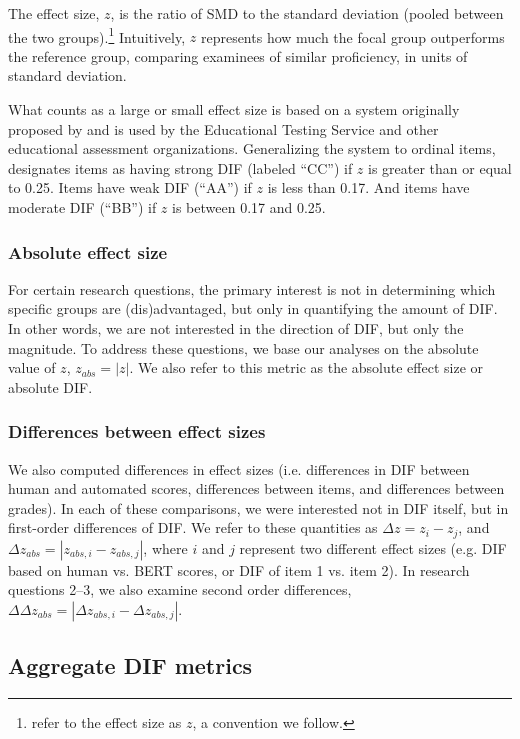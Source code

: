 \documentclass [PhD] {uclathes}
\begin{document}
The effect size, $z$, is the ratio of SMD to the standard deviation (pooled between the two groups).\footnote{\cite{ormerod2022automated} refer to the effect size as $z$, a convention we follow.} Intuitively, $z$ represents how much the focal group outperforms the reference group, comparing examinees of similar proficiency, in units of standard deviation.

What counts as a large or small effect size is based on a system originally proposed by \citet{zwick1993assessment} and is used by the Educational Testing Service and other educational assessment organizations. Generalizing the system to ordinal items, \citet[][p. 150]{naep2001} designates items as having strong DIF (labeled “CC”) if $z$ is greater than or equal to 0.25. Items have weak DIF (“AA”) if $z$ is less than 0.17. And items have moderate DIF (“BB”) if $z$ is between 0.17 and 0.25.

\subsubsection{Absolute effect size}

For certain research questions, the primary interest is not in determining which specific groups are (dis)advantaged, but only in quantifying the amount of DIF. In other words, we are not interested in the direction of DIF, but only the magnitude. To address these questions, we base our analyses on the absolute value of $z$, $z_{abs} = |z|$. We also refer to this metric as the absolute effect size or absolute DIF.

\subsubsection{Differences between effect sizes}

We also computed differences in effect sizes (i.e. differences in DIF between human and automated scores, differences between items, and differences between grades). In each of these comparisons, we were interested not in DIF itself, but in first-order differences of DIF. We refer to these quantities as $\Delta z = z_i - z_j$, and $\Delta z_{abs} = |z_{abs,i} - z_{abs,j}|$, where $i$ and $j$ represent two different effect sizes (e.g. DIF based on human vs. BERT scores, or DIF of item 1 vs. item 2). In research questions 2–3, we also examine second order differences, $\Delta \Delta z_{abs} = |\Delta z_{abs,i} - \Delta z_{abs,j}|$.

\subsection{Aggregate DIF metrics}
\end{document}
